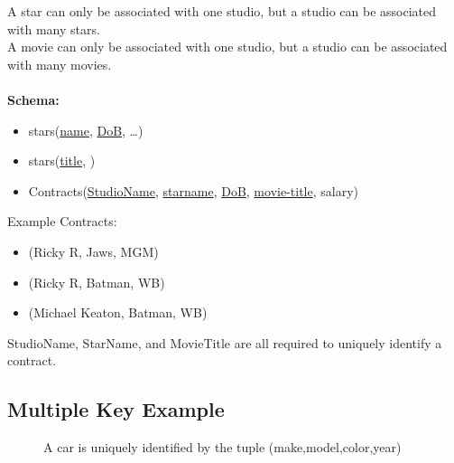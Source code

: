 \documentclass{article}
\begin{document}
A star can only be associated with one studio, but a studio can be associated
with many stars.\\
A movie can only be associated with one studio, but a studio can be associated
with many movies.\\\\
\textbf{Schema:}
\begin{itemize}
    \item{stars(\underline{name}, \underline{DoB}, \ldots)}
    \item{stars(\underline{title}, )}
    \item{Contracts(\underline{StudioName}, \underline{starname},
        \underline{DoB}, \underline{movie-title}, salary)}
\end{itemize}
%
Example Contracts:\\
\begin{itemize}
    \item{(Ricky R, Jaws, MGM)}
    \item{(Ricky R, Batman, WB)}
    \item{(Michael Keaton, Batman, WB)}
\end{itemize}
StudioName, StarName, and MovieTitle are all required to uniquely identify a
contract.

\subsection{Multiple Key Example}
\begin{figure}[H]
  \centering
  \caption{A car is uniquely identified by the tuple (make,model,color,year)}
\end{figure}
\end{document}
